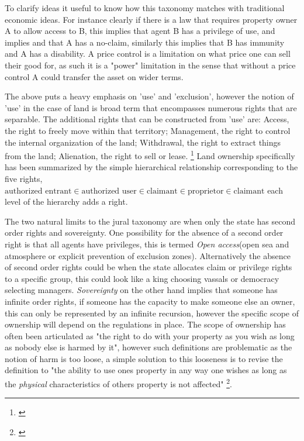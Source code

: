 \documentclass[12pt]{article}
\numberwithin{equation}{section}
\begin{document}
To clarify ideas it useful to know how this taxonomy matches with traditional economic ideas. For instance clearly if there is a law that requires property owner A to allow access to B, this implies that agent B has a privilege of use, and implies and that A has a no-claim, similarly this implies that B has immunity and A has a disability. A price control is a limitation on what price one can sell their good for, as such it is a "power" limitation in the sense that without a price control A could transfer the asset on wider terms.

The above puts a heavy emphasis on 'use' and 'exclusion', however the notion of 'use' in the case of land is broad term that encompasses numerous rights that are separable. The additional rights that can be constructed from 'use' are: Access, the right to freely move within that territory; Management, the right to control the internal organization of the land; Withdrawal, the right to extract things from the land; Alienation, the right to sell or lease. \footnote{\cite{ostrom2010private}}
Land ownership specifically has been summarized by the simple hierarchical relationship corresponding to the five rights, $\text{authorized entrant} \in \text{authorized user}  \in \text{claimant}  \in \text{proprietor} \in \text{claimant}$ each level of the hierarchy adds a right. \cite{schlager1992property}


The two natural limits to the jural taxonomy are when only the state has second order rights and sovereignty. One possibility for the absence of a second order right is that all agents have privileges, this is termed \textit{Open access}(open sea and atmosphere or explicit prevention of exclusion zones). Alternatively the absence of second order rights could be when the state allocates claim or privilege rights to a specific group, this could look like a king choosing vassals or democracy selecting managers. \textit{Sovereignty} on the other hand implies that someone has infinite order rights, if someone has the capacity to make someone else an owner, this can only be represented by an infinite recursion, however the specific scope of ownership will depend on the regulations in place. The scope of ownership has often been articulated as "the right to do with your property as you wish as long as nobody else is harmed by it", however such definitions are problematic as the notion of harm is too loose, a simple solution to this looseness is to revise the definition to "the ability to use ones property in any way one wishes as long as the \textit{physical} characteristics of others property is not affected" \footnote{\cite{Alchian1965}}.
\end{document}
